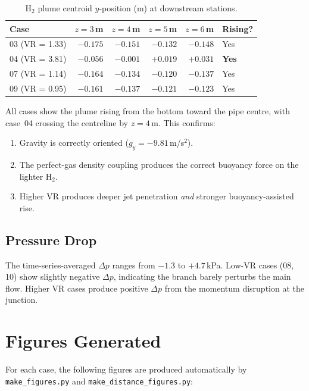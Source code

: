 \documentclass[12pt,a4paper]{report}
\begin{document}
\begin{table}[H]
\centering
\caption{H$_2$ plume centroid $y$-position (m) at downstream stations.}
\small
\begin{tabular}{@{}lrrrrl@{}}
\toprule
\textbf{Case} & $z = 3$\,m & $z = 4$\,m & $z = 5$\,m & $z = 6$\,m & \textbf{Rising?} \\
\midrule
03 (VR = 1.33) & $-0.175$ & $-0.151$ & $-0.132$ & $-0.148$ & Yes \\
04 (VR = 3.81) & $-0.056$ & $-0.001$ & $+0.019$ & $+0.031$ & \textbf{Yes} \\
07 (VR = 1.14) & $-0.164$ & $-0.134$ & $-0.120$ & $-0.137$ & Yes \\
09 (VR = 0.95) & $-0.161$ & $-0.137$ & $-0.121$ & $-0.123$ & Yes \\
\bottomrule
\end{tabular}
\end{table}

\noindent All cases show the plume rising from the bottom toward
the pipe centre, with case~04 crossing the centreline by
$z = 4$\,m.  This confirms:
\begin{enumerate}
  \item Gravity is correctly oriented ($g_y = -9.81$\,m/s$^2$).
  \item The perfect-gas density coupling produces the correct
        buoyancy force on the lighter H$_2$.
  \item Higher VR produces deeper jet penetration \emph{and}
        stronger buoyancy-assisted rise.
\end{enumerate}

\subsection{Pressure Drop}

The time-series-averaged $\Delta p$ ranges from $-1.3$ to $+4.7$\,kPa.
Low-VR cases (08, 10) show slightly negative $\Delta p$, indicating
the branch barely perturbs the main flow.  Higher VR cases produce
positive $\Delta p$ from the momentum disruption at the junction.


\section{Figures Generated}

For each case, the following figures are produced automatically by
\texttt{make\_figures.py} and \texttt{make\_distance\_figures.py}:
\end{document}
